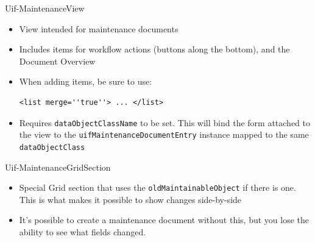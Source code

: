 \documentclass[xcolor=dvipsnames,14pt,professionalfonts]{beamer}
\begin{document}
\begin{frame}[fragile]{Uif-MaintenanceView}
  \begin{itemize}
    \item View intended for maintenance documents
    \item Includes items for workflow actions (buttons along the
      bottom), and the Document Overview
    \item When adding items, be sure to use:
      \begin{verbatim}
<list merge=''true''> ... </list>
      \end{verbatim}
    \item Requires \texttt{dataObjectClassName} to be set. This will
      bind the form attached to the view to the
      \texttt{uifMaintenanceDocumentEntry} instance mapped to the same \texttt{dataObjectClass}
      
    \end{itemize}
\end{frame}

\begin{frame}{Uif-MaintenanceGridSection}
  \begin{itemize}
  \item Special Grid section that uses the
    \texttt{oldMaintainableObject} if there is one. This is what makes
    it possible to show changes side-by-side
  \item It's possible to create a maintenance document without this,
    but you lose the ability to see what fields changed.
    \end{itemize}
\end{frame}
\end{document}
